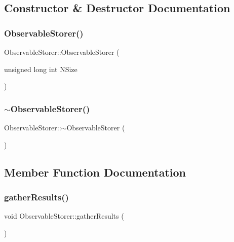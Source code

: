 \subsection{Constructor \& Destructor Documentation}
\mbox{\label{class_observable_storer_a12833458c54a15e1abe299d628fc993c}} 
\subsubsection{\texorpdfstring{ObservableStorer()}{ObservableStorer()}}
{\footnotesize\ttfamily Observable\+Storer\+::\+Observable\+Storer (\begin{DoxyParamCaption}\item[{unsigned long int}]{N\+Size }\end{DoxyParamCaption})}

\mbox{\label{class_observable_storer_ac702a77bd6c6c0bff76d7b3959e8f658}} 
\subsubsection{\texorpdfstring{$\sim$ObservableStorer()}{~ObservableStorer()}}
{\footnotesize\ttfamily Observable\+Storer\+::$\sim$\+Observable\+Storer (\begin{DoxyParamCaption}{ }\end{DoxyParamCaption})}



\subsection{Member Function Documentation}
\mbox{\label{class_observable_storer_a593f13b0dd0f9d20608ef6b84fda3f1d}} 
\subsubsection{\texorpdfstring{gatherResults()}{gatherResults()}}
{\footnotesize\ttfamily void Observable\+Storer\+::gather\+Results (\begin{DoxyParamCaption}{ }\end{DoxyParamCaption})}

